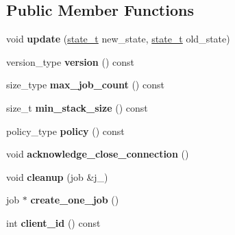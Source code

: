 \subsection*{Public Member Functions}
\begin{DoxyCompactItemize}
\item 
\hypertarget{classClientBase_afc4d384ecfc8aa9755c034b58b1c5a0e}{}void {\bfseries update} (\hyperlink{classClientBase_a2c65b478eaf40b5bf4c6f7fb83a81990}{state\+\_\+t} new\+\_\+state, \hyperlink{classClientBase_a2c65b478eaf40b5bf4c6f7fb83a81990}{state\+\_\+t} old\+\_\+state)\label{classClientBase_afc4d384ecfc8aa9755c034b58b1c5a0e}

\item 
\hypertarget{classClientBase_a4b22055858e6e6fbe5fca29da2d8089b}{}version\+\_\+type {\bfseries version} () const \label{classClientBase_a4b22055858e6e6fbe5fca29da2d8089b}

\item 
\hypertarget{classClientBase_a0ffaf647412327ec85745e7ff36c6bc8}{}size\+\_\+type {\bfseries max\+\_\+job\+\_\+count} () const \label{classClientBase_a0ffaf647412327ec85745e7ff36c6bc8}

\item 
\hypertarget{classClientBase_a3d2ddd9136024e5572d4a5d7306abc22}{}size\+\_\+t {\bfseries min\+\_\+stack\+\_\+size} () const \label{classClientBase_a3d2ddd9136024e5572d4a5d7306abc22}

\item 
\hypertarget{classClientBase_a80c459ec2b61ca2cbe3d0add119461d8}{}policy\+\_\+type {\bfseries policy} () const \label{classClientBase_a80c459ec2b61ca2cbe3d0add119461d8}

\item 
\hypertarget{classClientBase_a1d49a550f3a8626b683225d08bbdce7e}{}void {\bfseries acknowledge\+\_\+close\+\_\+connection} ()\label{classClientBase_a1d49a550f3a8626b683225d08bbdce7e}

\item 
\hypertarget{classClientBase_ad24fc4d3c987388ce65c8a2bb2f5df04}{}void {\bfseries cleanup} (job \&j\+\_\+)\label{classClientBase_ad24fc4d3c987388ce65c8a2bb2f5df04}

\item 
\hypertarget{classClientBase_a6c98a1d5d2e2afb0776545b545a474b2}{}job $\ast$ {\bfseries create\+\_\+one\+\_\+job} ()\label{classClientBase_a6c98a1d5d2e2afb0776545b545a474b2}

\item 
\hypertarget{classClientBase_a1037f0b07dbf9e7c396253bbe0c89d2f}{}int {\bfseries client\+\_\+id} () const \label{classClientBase_a1037f0b07dbf9e7c396253bbe0c89d2f}


\end{DoxyCompactItemize}
